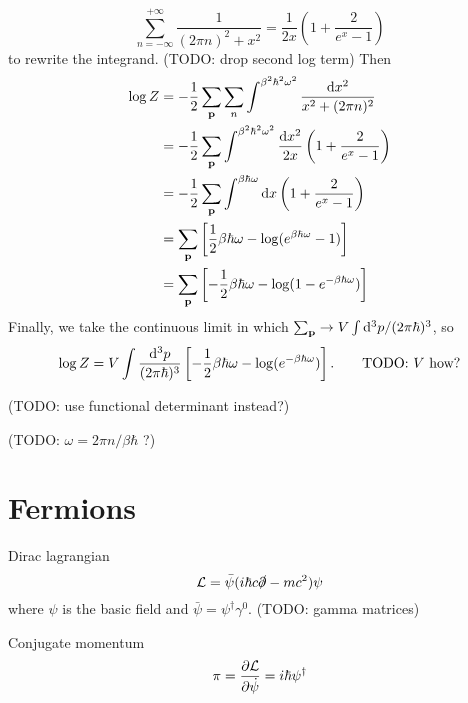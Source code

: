 \begin{equation}
	\sum_{n=-\infty}^{+\infty} \frac{1}{(2 \pi n)^2 + x^2} = \frac{1}{2 x} \left( 1 + \frac{2}{e^x - 1} \right)
\end{equation}
to rewrite the integrand.
(TODO: drop second log term)
Then
\begin{equation}
\begin{split}
	\log Z & = -\frac12 \sum_{\mathbf{p}} \sum_n \int^{\beta^2 \hbar^2 \omega^2} \frac{\mathop{}\!\mathrm{d} x^2}{x^2 + (2 \pi n)^2} \\
	       & = -\frac12 \sum_{\mathbf{p}}        \int^{\beta^2 \hbar^2 \omega^2} \frac{\mathop{}\!\mathrm{d} x^2}{2 x} \left( 1 + \frac{2}{e^x - 1} \right) \\
	       & = -\frac12 \sum_{\mathbf{p}}        \int^{\beta   \hbar   \omega  }       \mathop{}\!\mathrm{d} x         \left( 1 + \frac{2}{e^x - 1} \right) \\
	       & =          \sum_{\mathbf{p}}        \left[  \frac12 \beta \hbar \omega - \log(e^{\beta \hbar \omega} - 1) \right] \\
	       & =          \sum_{\mathbf{p}}        \left[ -\frac12 \beta \hbar \omega - \log(1 - e^{-\beta \hbar \omega}) \right] \\
\end{split}
\end{equation}
Finally, we take the continuous limit in which $\sum_{\mathbf{p}} \rightarrow V \int \mathop{}\!\mathrm{d}^3 p / (2 \pi \hbar)^3$, so
\begin{equation}
	\log Z = V \int \frac{\mathop{}\!\mathrm{d}^3 p}{(2 \pi \hbar)^3} \left[ -\frac12 \beta \hbar \omega - \log(e^{-\beta \hbar \omega}) \right] .
	\qquad \text{TODO: $V$ how?}
\end{equation}

(TODO: use functional determinant instead?)

(TODO: $\omega = 2 \pi n / \beta \hbar$ ?)

\section{Fermions}

Dirac lagrangian
\begin{equation}
	\mathcal{L} = \bar\psi (i \hbar c \slashed\partial - m c^2) \psi
\end{equation}
where $\psi$ is the basic field and $\bar\psi = \psi^\dagger \gamma^0$.
(TODO: gamma matrices)

Conjugate momentum
\begin{equation}
	\pi = \pdv{\mathcal{L}}{\dot{\psi}} = i \hbar \psi^\dagger
\end{equation}

